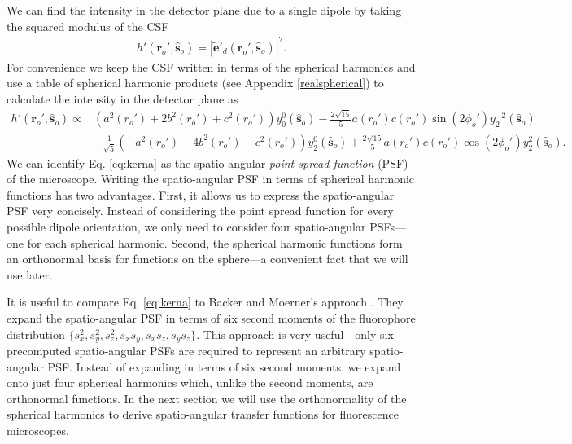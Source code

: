 \documentclass[11pt]{article}
\providecommand{\mb}[1]{\mathbf{#1}}
\providecommand{\ro}[1]{\mathbf{\mathbf{r}}_o}
\providecommand{\so}[1]{\mathbf{\hat{s}}_o}
\begin{document}
We can find the intensity in the detector plane due to a single dipole
by taking the squared modulus of the CSF
\begin{align}
  h'(\ro{}', \so{}) = \left|\tilde{\mb{e}}'_d(\ro{}', \so{})\right|^2 \label{eq:kernel}.
\end{align}
For convenience we keep the CSF written in terms of the spherical harmonics and
use a table of spherical harmonic products (see Appendix \ref{realspherical}) to
calculate the intensity in the detector plane as
\begin{equation}
  \begin{split}
  h'(\ro{}', \so{}) \propto &\left(a^2(r_o') + 2b^2(r_o') + c^2(r_o')\right)y_0^0(\so{}) -\frac{2\sqrt{15}}{5}a(r_o')c(r_o')\sin(2\phi_o')y_2^{-2}(\so{})\\ &+ \frac{1}{\sqrt{5}}\left(-a^2(r_o') + 4b^2(r_o') - c^2(r_o')\right)y_2^{0}(\so{}) +\frac{2\sqrt{15}}{5}a(r_o')c(r_o')\cos(2\phi_o')y_2^{2}(\so{}). \label{eq:kerna}
\end{split}
\end{equation}
We can identify Eq. \ref{eq:kerna} as the spatio-angular \textit{point spread
  function} (PSF) of the microscope. Writing the spatio-angular PSF in terms of
spherical harmonic functions has two advantages. First, it allows us to express
the spatio-angular PSF very concisely. Instead of considering the point spread
function for every possible dipole orientation, we only need to consider four
spatio-angular PSFs---one for each spherical harmonic. Second, the spherical
harmonic functions form an orthonormal basis for functions on the sphere---a
convenient fact that we will use later.

It is useful to compare Eq. \ref{eq:kerna} to Backer and Moerner's approach
\cite{backer2014}. They expand the spatio-angular PSF in terms of six second
moments of the fluorophore distribution
$\{s_x^2, s_y^2, s_z^2, s_xs_y, s_xs_z, s_ys_z\}$. This approach is very
useful---only six precomputed spatio-angular PSFs are required to represent an
arbitrary spatio-angular PSF. Instead of expanding in terms of six second
moments, we expand onto just four spherical harmonics which, unlike the second
moments, are orthonormal functions. In the next section we will use the
orthonormality of the spherical harmonics to derive spatio-angular transfer
functions for fluorescence microscopes.
\end{document}
